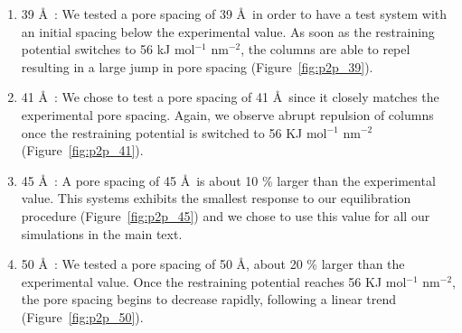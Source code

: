 \documentclass[journal=jpcbfk,manusciprt=article]{achemso}
\begin{document}
	  \begin{enumerate}

		\item 39 \AA~: We tested a pore spacing of 39 \AA~in order to
		have a test system with an initial spacing below the experimental value. As soon
		as the restraining potential switches to 56 kJ mol$^{-1}$ nm$^{-2}$, the
		columns are able to repel resulting in a large jump in pore spacing
		(Figure~\ref{fig:p2p_39}). %

		\item 41 \AA~: We chose to test a pore spacing of 41 \AA~since
		it closely matches the experimental pore spacing. Again, we observe abrupt
		repulsion of columns once the restraining potential is switched to 56 KJ
		mol$^{-1}$ nm$^{-2}$ (Figure~\ref{fig:p2p_41}). %

		\item 45 \AA~: A pore spacing of 45 \AA~is about 10 \% larger
		than the experimental value. This systems exhibits the smallest response to our 
 		equilibration procedure (Figure~\ref{fig:p2p_45}) and we chose to use this
        value for all our simulations in the main text.

		\item 50 \AA~: We tested a pore spacing of 50 \AA, about 20 \%
		larger than the experimental value. Once the restraining potential reaches 56
		KJ mol$^{-1}$ nm$^{-2}$, the pore spacing begins to decrease rapidly, following
		a linear trend (Figure~\ref{fig:p2p_50}).
                

\end{enumerate}
\end{document}
